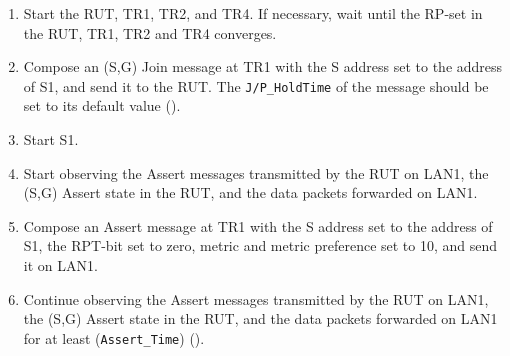 \documentclass[11pt]{report}
\begin{document}

\begin{enumerate}

  \item Start the RUT, TR1, TR2, and TR4. If necessary, wait until the RP-set
  in the RUT, TR1, TR2 and TR4 converges.

  \item Compose an (S,G) Join message at TR1 with the S address set to the
  address of S1, and send it to the RUT.
  The \verb=J/P_HoldTime= of the message should be set to its default
  value ({\PimsmJPHoldTime}).

  \item Start S1.

  \item Start observing the Assert messages transmitted by the RUT on
  LAN1, the (S,G) Assert state in the RUT, and the data packets forwarded on
  LAN1.

  \item Compose an Assert message at TR1 with the S address set to the
  address of S1, the RPT-bit set to zero, metric and metric preference set to
  10, and send it on LAN1.

  \item Continue observing the Assert messages transmitted by the RUT on
  LAN1, the (S,G) Assert state in the RUT, and the data packets forwarded on
  LAN1 for at least (\verb=Assert_Time=) ({\PimsmAssertTime}).

\end{enumerate}

\end{document}
